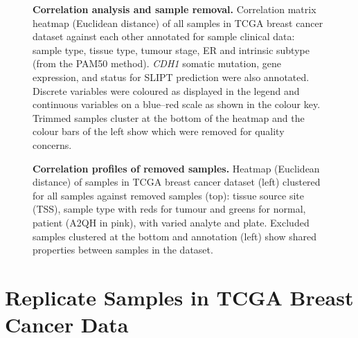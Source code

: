 
\begin{figure}[!ht]
  \begin{center}
   \end{center}
   \caption[Correlation analysis and sample removal]{\small \textbf{Correlation analysis and sample removal.} Correlation matrix heatmap (Euclidean distance) of all samples in \gls{TCGA} breast cancer dataset against each other annotated for sample clinical data: sample type, tissue type, tumour stage, \gls{ER} and intrinsic subtype (from the \acrshort{PAM50} method). \textit{CDH1} somatic mutation, gene expression, and status for \gls{SLIPT} prediction were also annotated. Discrete variables were coloured as displayed in the legend and continuous variables on a blue--red scale as shown in the colour key. Trimmed samples cluster at the bottom of the heatmap and the colour bars of the left show which were removed for quality concerns.}
\label{fig:corr_map}
\end{figure}

\begin{figure}[!ht]
  \begin{center}
   \end{center}
   \caption[Correlation profiles of removed samples]{\small \textbf{Correlation profiles of removed samples.} Heatmap (Euclidean distance) of samples in \gls{TCGA} breast cancer dataset (left) clustered for all samples against removed samples (top): 
   tissue source site (TSS), sample type with reds for tumour and greens for normal, patient (A2QH in pink), with varied analyte and plate. %
   Excluded samples clustered at the bottom and annotation (left) show  shared properties between samples in the dataset.
   }
\label{fig:corr_map_part}
\end{figure}

\clearpage

\section{Replicate Samples in TCGA Breast Cancer Data}
\label{appendix:replicate_samples}

